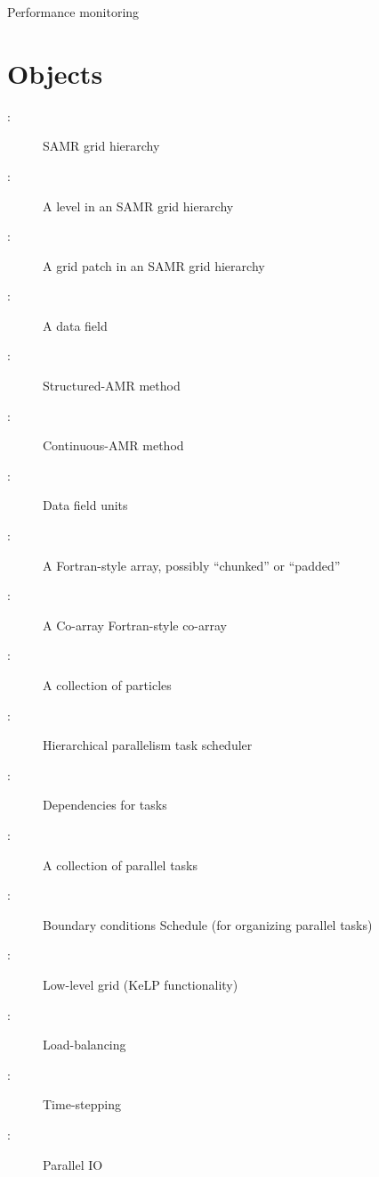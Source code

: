 \documentclass{article}
\begin{document}
Performance monitoring

\section{Objects} \label{s:intro}

\begin{description}
\item[: ] SAMR grid hierarchy
\item[: ]     A level in an SAMR grid hierarchy
\item[: ]      A grid patch in an SAMR grid hierarchy
\item[: ]     A data field
\item[: ]  Structured-AMR method
\item[: ]   Continuous-AMR method
\item[: ]     Data field units
\item[: ]     A Fortran-style array, possibly ``chunked'' or ``padded''
\item[: ]   A Co-array Fortran-style co-array
\item[: ] A collection of particles
\item[: ]  Hierarchical parallelism task scheduler
\item[: ] Dependencies for tasks
\item[: ]     A collection of parallel tasks
\item[: ]        Boundary conditions
      Schedule (for organizing parallel tasks)
\item[: ]       Low-level grid (KeLP functionality)
\item[: ]    Load-balancing
\item[: ] Time-stepping
\item[: ]         Parallel IO
\end{description}

\end{document}
